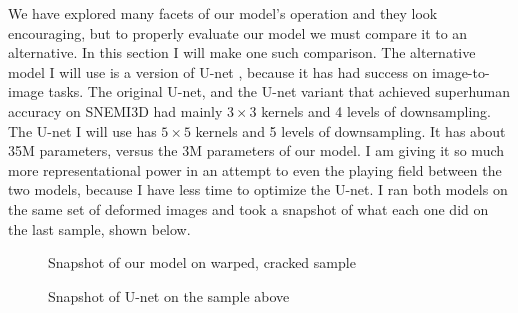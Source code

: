 \documentclass[12pt,a4paper]{article}
\begin{document}
We have explored many facets of our model's operation and they look encouraging, but to properly evaluate our model we must compare it to an alternative. In this section I will make one such comparison. The alternative model I will use is a version of U-net \cite{unet}, because it has had success on image-to-image tasks. The original U-net, and the U-net variant that achieved superhuman accuracy on SNEMI3D \cite{snemi} had mainly $3 \times 3$ kernels and 4 levels of downsampling. The U-net I will use has $5 \times 5$ kernels and 5 levels of downsampling. It has about 35M parameters, versus the 3M parameters of our model. I am giving it so much more representational power in an attempt to even the playing field between the two models, because I have less time to optimize the U-net. I ran both models on the same set of deformed images and took a snapshot of what each one did on the last sample, shown below.

\newpage

\begin{figure}[H]
\centering
{}
\hspace{3mm}
\hspace{0mm}
\hspace{3mm}
\hspace{0mm}
\hspace{3mm}
\caption{Snapshot of our model on warped, cracked sample}
\end{figure}

\newpage

\begin{figure}[H]
\centering
{}
\hspace{3mm}
\hspace{0mm}
\hspace{3mm}
\hspace{0mm}
\hspace{3mm}
\caption{Snapshot of U-net on the sample above}
\end{figure}
\end{document}
